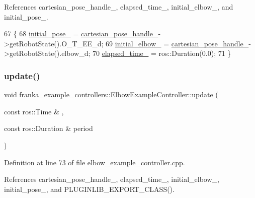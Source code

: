 References cartesian\+\_\+pose\+\_\+handle\+\_\+, elapsed\+\_\+time\+\_\+, initial\+\_\+elbow\+\_\+, and initial\+\_\+pose\+\_\+.


\begin{DoxyCode}
67                                                       \{
68   \hyperlink{classfranka__example__controllers_1_1ElbowExampleController_a93ff73dad84295cd4c822b6bb843bc3c}{initial\_pose\_} = \hyperlink{classfranka__example__controllers_1_1ElbowExampleController_a911a7a82e55ba8f023ec8c0a9c8d2bd9}{cartesian\_pose\_handle\_}->getRobotState().O\_T\_EE\_d;
69   \hyperlink{classfranka__example__controllers_1_1ElbowExampleController_a5addb6a766aa1ad5e193796976307ef1}{initial\_elbow\_} = \hyperlink{classfranka__example__controllers_1_1ElbowExampleController_a911a7a82e55ba8f023ec8c0a9c8d2bd9}{cartesian\_pose\_handle\_}->getRobotState().elbow\_d;
70   \hyperlink{classfranka__example__controllers_1_1ElbowExampleController_adbacbe4e9d5314fc0a881f16b7ffa3c2}{elapsed\_time\_} = ros::Duration(0.0);
71 \}
\end{DoxyCode}
\mbox{\label{classfranka__example__controllers_1_1ElbowExampleController_a0f3e4ef04d7d4eba6019ae68c621a3a0}} 
\subsubsection{\texorpdfstring{update()}{update()}}
{\footnotesize\ttfamily void franka\+\_\+example\+\_\+controllers\+::\+Elbow\+Example\+Controller\+::update (\begin{DoxyParamCaption}\item[{const ros\+::\+Time \&}]{,  }\item[{const ros\+::\+Duration \&}]{period }\end{DoxyParamCaption})\hspace{0.3cm}{\ttfamily [override]}}



Definition at line 73 of file elbow\+\_\+example\+\_\+controller.\+cpp.



References cartesian\+\_\+pose\+\_\+handle\+\_\+, elapsed\+\_\+time\+\_\+, initial\+\_\+elbow\+\_\+, initial\+\_\+pose\+\_\+, and P\+L\+U\+G\+I\+N\+L\+I\+B\+\_\+\+E\+X\+P\+O\+R\+T\+\_\+\+C\+L\+A\+S\+S().


